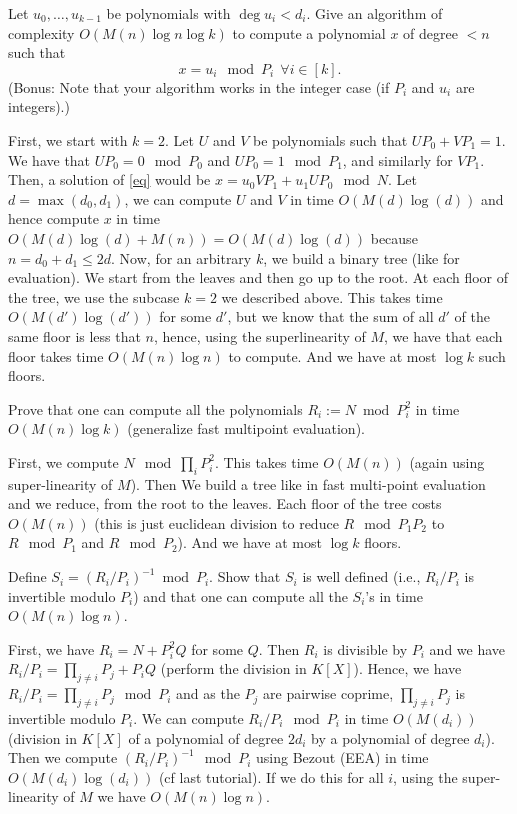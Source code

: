 \documentclass[11pt]{exam}
\theoremstyle{definition}
\begin{document}
{\begin{questions}
\question Let $u_0, \dots, u_{k-1}$ be polynomials with
  $\deg u_i < d_i$. Give an algorithm of complexity $O(M(n) \log n \log k)$
  to compute a polynomial $x$ of degree $< n$ such that 
  \begin{equation}
  \label{eq}
  x = u_i \mod P_i \ \ \forall i \in [k].
  \end{equation}
  (Bonus: Note that your algorithm works in the integer case 
  (if $P_i$ and $u_i$ are integers).) 
  
  \begin{solution}
  First, we start with $k = 2$. Let $U$ and $V$ be polynomials such that $UP_0 + VP_1 = 1$. We have that $UP_0 = 0 \mod P_0$ and $UP_0 = 1 \mod P_1$, and similarly for $VP_1$. Then, a solution of \ref{eq} would be $x = u_0 VP_1 + u_1 UP_0 \mod N$. Let $d = \max(d_0, d_1)$, we can compute $U$ and $V$ in time $O(M(d) \log(d))$ and hence compute $x$ in time $O(M(d)\log(d)+M(n)) = O(M(d) \log(d))$ because $n = d_0+d_1 \leq 2d$.
  Now, for an arbitrary $k$, we build a binary tree (like for evaluation). We start from the leaves and then go up to the root. At each floor of the tree, we use the subcase $k=2$ we described above. This takes time $O(M(d')\log(d'))$ for some $d'$, but we know that the sum of all $d'$ of the same floor is less that $n$, hence, using the superlinearity of $M$, we have that each floor takes time $O(M(n) \log n)$ to compute. And we have at most $\log k$ such floors.
  \end{solution}

\question Prove that one can compute all the polynomials
  $R_i := N \bmod P_i^2$ in time $O(M(n) \log k)$ (generalize fast multipoint
  evaluation). 
  
  \begin{solution}
  First, we compute $N \mod \prod_i P_i^2$. This takes time $O(M(n))$ (again using super-linearity of $M$). Then We build a tree like in fast multi-point evaluation and we reduce, from the root to the leaves. Each floor of the tree costs $O(M(n))$ (this is just euclidean division to reduce $R \mod P_1P_2$ to $R \mod P_1$ and $R \mod P_2$). And we have at most $\log k$ floors.
  \end{solution}

\question Define $S_i = (R_i/P_i)^{-1} \bmod
  P_i$. Show that $S_i$ is well defined (i.e., $R_i/P_i$ is invertible modulo $P_i$) and that one can compute all the $S_i$'s in time $O(M(n) \log
  n)$. 
  \begin{solution}
  First, we have $R_i = N + P_i^2 Q$ for some $Q$. Then $R_i$ is divisible by $P_i$ and we have $R_i/P_i = \prod_{j \neq i} P_j + P_i Q$ (perform the division in $K[X]$). Hence, we have $R_i/P_i = \prod_{j \neq i} P_j \mod P_i$ and as the $P_j$ are pairwise coprime, $\prod_{j \neq i} P_j$ is invertible modulo $P_i$. We can compute $R_i/P_i \mod P_i$ in time $O(M(d_i))$ (division in $K[X]$ of a polynomial of degree $2d_i$ by a polynomial of degree $d_i$). Then we compute $(R_i/P_i)^{-1} \mod P_i$ using Bezout  (EEA) in time $O(M(d_i) \log(d_i))$ (cf last tutorial). If we do this for all $i$, using the super-linearity of $M$ we have $O(M(n)\log n)$.
  \end{solution}


\end{questions}}
\end{document}
